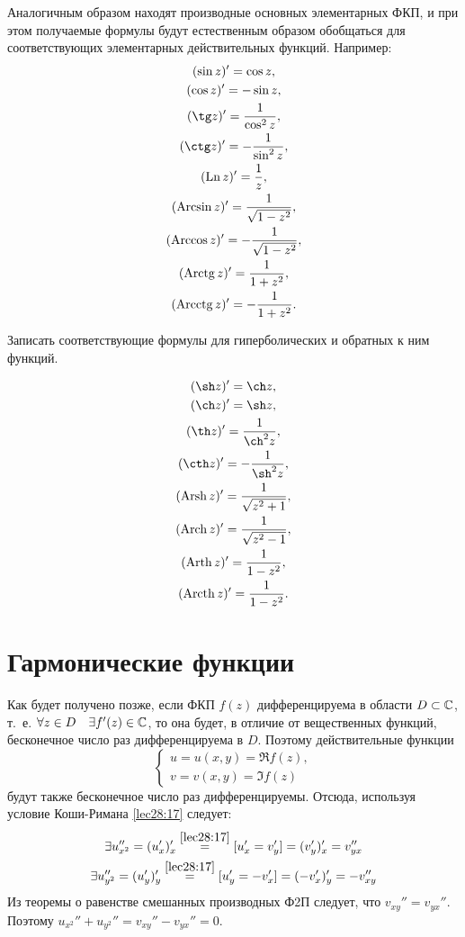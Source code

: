 \documentclass[../../main.tex]{subfiles}
\begin{document}
Аналогичным образом находят производные основных элементарных ФКП, 
и при этом получаемые формулы будут естественным образом обобщаться для
соответствующих элементарных действительных функций. Например:
\[
\begin{gathered}
(\sin z)' = \cos z,\\ (\cos z)' = -\sin z,\\
(\tg z)' = \dfrac{1}{\cos^2 z},\\ 
(\ctg z)' = -\dfrac{1}{\sin^2 z},\\
(\Ln z)' = \dfrac{1}{z},\\
(\Arcsin z)' = \dfrac{1}{\sqrt{1 - z^2}},\\
(\Arccos z)' = -\dfrac{1}{\sqrt{1 - z^2}},\\
(\Arctg z)' = \dfrac{1}{1 + z^2},\\
(\Arcctg z)' = -\dfrac{1}{1 + z^2}.
\end{gathered}
\]
\begin{exc}
	Записать соответствующие формулы для гиперболических 
	и обратных к ним функций.
\end{exc}
\begin{eans}
\begin{gather*}
(\sh z)' = \ch z,\\
(\ch z)' = \sh z,\\
(\th z)' = \dfrac{1}{\ch^2 z},\\
(\cth z)' = -\dfrac{1}{\sh^2 z},\\
(\Arsh z)' = \dfrac{1}{\sqrt{z^2 + 1}},\\
(\Arch z)' = \dfrac{1}{\sqrt{z^2 - 1}},\\
(\Arth z)' = \dfrac{1}{1 - z^2},\\
(\Arcth z)' = \dfrac{1}{1 - z^2}.
\end{gather*}
\end{eans}

\section{Гармонические функции}

Как будет получено позже, если ФКП $ f(z) $ дифференцируема в области
$ D \subset \mathbb{C} $, т.~е. $ \forall z \in D \quad\exists f'(z) \in \mathbb{C} $, то она 
будет,
в отличие от вещественных функций, бесконечное число раз дифференцируема в 
$D$. Поэтому действительные функции 
\[
\begin{cases}
	u = u(x, y) = \Re f(z),\\
	v = v(x, y) = \Im f(z)
\end{cases}
\]
будут также бесконечное число раз дифференцируемы. Отсюда, используя условие
Коши-Римана \eqref{lec28:17} следует:
\[
\begin{gathered}
\exists u_{x^2}'' = (u_x')_x' 
\stackrel{\eqref{lec28:17}}{=}
[u_x' = v_y'] = (v_y')_x' = v_{yx}''\\
\exists u_{y^2}'' = (u_y')_y' 
\stackrel{\eqref{lec28:17}}{=}
[u_y' = -v_x'] = (-v_x')_y' = -v_{xy}''\\
\end{gathered}
\]
Из теоремы о равенстве смешанных производных Ф2П следует, что 
$ v_{xy}'' = v_{yx}'' $. Поэтому $ u_{x^2}'' + u_{y^2}'' = v_{xy}'' - 
v_{yx}'' = 0 $.
\end{document}
